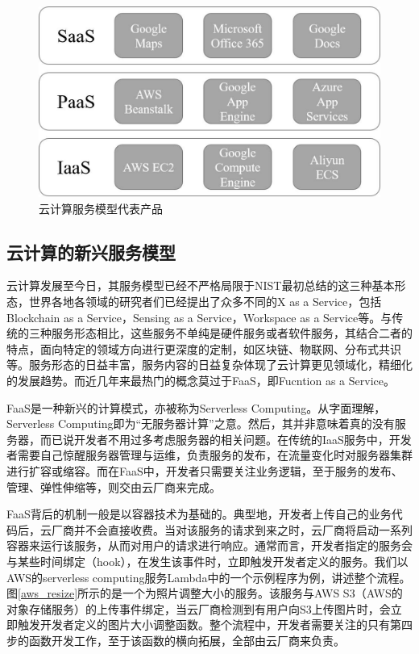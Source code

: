 \begin{figure}
    \centerline{\includegraphics[width=\textwidth]{figures/rep_products.jpg}}
    \caption{云计算服务模型代表产品}
    \label{rep_products}
\end{figure}

\subsection{云计算的新兴服务模型}

云计算发展至今日，其服务模型已经不严格局限于NIST最初总结的这三种基本形态，世界各地各领域的研究者们已经提出了众多不同的X as a Service，包括Blockchain as a Service\parencite{samaniego2016blockchain}，Sensing as a Service\parencite{perera2014sensing}，Workspace as a Service\parencite{an2017workspace}等。与传统的三种服务形态相比，这些服务不单纯是硬件服务或者软件服务，其结合二者的特点，面向特定的领域方向进行更深度的定制，如区块链、物联网、分布式共识等。服务形态的日益丰富，服务内容的日益复杂体现了云计算更见领域化，精细化的发展趋势。而近几年来最热门的概念莫过于FaaS，即Fucntion as a Service\parencite{baldini2017serverless}。

FaaS是一种新兴的计算模式，亦被称为Serverless Computing。从字面理解，Serverless Computing即为“无服务器计算”之意。然后，其并非意味着真的没有服务器，而已说开发者不用过多考虑服务器的相关问题。在传统的IaaS服务中，开发者需要自己惊醒服务器管理与运维，负责服务的发布，在流量变化时对服务器集群进行扩容或缩容。而在FaaS中，开发者只需要关注业务逻辑，至于服务的发布、管理、弹性伸缩等，则交由云厂商来完成。

FaaS背后的机制一般是以容器技术为基础的。典型地，开发者上传自己的业务代码后，云厂商并不会直接收费。当对该服务的请求到来之时，云厂商将启动一系列容器来运行该服务，从而对用户的请求进行响应。通常而言，开发者指定的服务会与某些时间绑定（hook），在发生该事件时，立即触发开发者定义的服务。我们以AWS的serverless computing服务Lambda\parencite{klems2018aws}中的一个示例程序为例，讲述整个流程。图\ref{aws_resize}所示的是一个为照片调整大小的服务。该服务与AWS S3（AWS的对象存储服务）的上传事件绑定，当云厂商检测到有用户向S3上传图片时，会立即触发开发者定义的图片大小调整函数。整个流程中，开发者需要关注的只有第四步的函数开发工作，至于该函数的横向拓展，全部由云厂商来负责。

